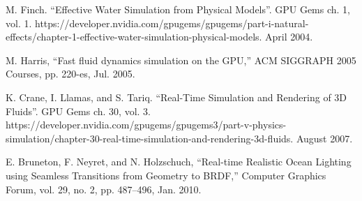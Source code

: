 \documentclass[conference]{IEEEtran}
\begin{document}
\begin{thebibliography}{00}

 M. Finch. ``Effective Water Simulation from Physical Models''. GPU Gems ch. 1, vol. 1. https://developer.nvidia.com/gpugems/gpugems/part-i-natural-effects/chapter-1-effective-water-simulation-physical-models. April 2004.

 M. Harris, “Fast fluid dynamics simulation on the GPU,” ACM SIGGRAPH 2005 Courses, pp. 220-es, Jul. 2005. 

 K. Crane, I. Llamas, and S. Tariq. ``Real-Time Simulation and Rendering of 3D Fluids''. GPU Gems ch. 30, vol. 3. https://developer.nvidia.com/gpugems/gpugems3/part-v-physics-simulation/chapter-30-real-time-simulation-and-rendering-3d-fluids. August 2007.

 E. Bruneton, F. Neyret, and N. Holzschuch, “Real-time Realistic Ocean Lighting using Seamless Transitions from Geometry to BRDF,” Computer Graphics Forum, vol. 29, no. 2, pp. 487–496, Jan. 2010. 

\end{thebibliography}
\end{document}
